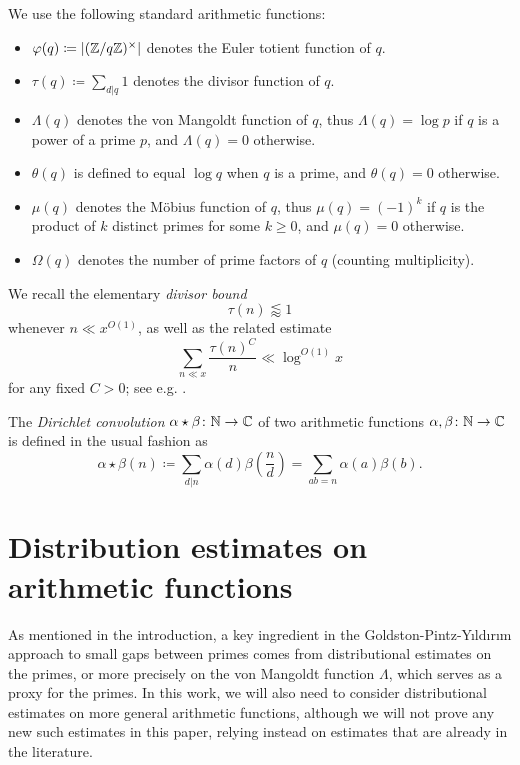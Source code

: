 We use the following standard arithmetic functions:
\begin{itemize}
\item[(i)] $\varphi(q) \coloneqq |(\mathbb{Z}/q\mathbb{Z})^\times|$ denotes the Euler totient function of $q$.
\item[(ii)] $\tau(q) \coloneqq \sum_{d|q} 1$ denotes the divisor function of $q$.
\item[(iii)] $\Lambda(q)$ denotes the von Mangoldt function of $q$, thus $\Lambda(q)=\log p$ if $q$ is a power of a prime $p$, and $\Lambda(q)=0$ otherwise.
\item[(iv)] $\theta(q)$ is defined to equal $\log q$ when $q$ is a prime, and $\theta(q)=0$ otherwise.
\item[(v)] $\mu(q)$ denotes the M\"obius function of $q$, thus $\mu(q) = (-1)^k$ if $q$ is the product of $k$ distinct primes for some $k \geq 0$, and $\mu(q)=0$ otherwise.
\item[(vi)] $\Omega(q)$ denotes the number of prime factors of $q$ (counting multiplicity).
\end{itemize}

We recall the elementary \emph{divisor bound}
\begin{equation}\label{divisor-bound}
\tau(n) \lessapprox 1
\end{equation}
whenever $n \ll x^{O(1)}$, as well as the related estimate
\begin{equation}\label{divisor-2}
\sum_{n \ll x} \frac{\tau(n)^C}{n} \ll \log^{O(1)} x
\end{equation}
for any fixed $C>0$; see e.g. \cite[Lemma 1.5]{polymath8a}.

The \emph{Dirichlet convolution} $\alpha \star \beta \colon \mathbb{N} \to \mathbb{C}$
of two arithmetic functions $\alpha,\beta \colon \mathbb{N} \to \mathbb{C}$ is defined
in the usual fashion as
$$ \alpha\star\beta(n) \coloneqq \sum_{d|n} \alpha(d)
\beta\left(\frac{n}{d}\right) =\sum_{ab=n}{\alpha(a)\beta(b)}.$$

\section{Distribution estimates on arithmetic functions}

As mentioned in the introduction, a key ingredient in the Goldston-Pintz-Y{\i}ld{\i}r{\i}m approach to small gaps between primes comes from distributional estimates on the primes, or more precisely on the von Mangoldt function $\Lambda$, which serves as a proxy for the primes.  In this work, we will also need to consider distributional estimates on more general arithmetic functions, although we will not prove any new such estimates in this paper, relying instead on estimates that are already in the literature.  

